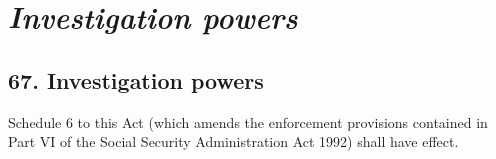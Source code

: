 \documentclass[12pt,a4paper]{article}
\begin{document}
%
%
%
%
%
%
%
%
%
%

\section{\itshape Investigation powers}

\subsection{67. Investigation powers}

Schedule 6 to this Act (which amends the enforcement provisions contained in Part VI of the Social Security Administration Act 1992) shall have effect.
\end{document}
